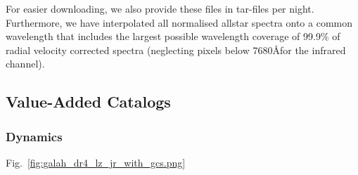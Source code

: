 \documentclass[
  journal=pasa,
  manuscript=research-paper, %
  year=2023,
  volume=37
]{cup-journal}
\newcommand{\SB}[1]{{\textcolor{purple}{#1}}}
\begin{document}
For easier downloading, we also provide these files in tar-files per night. Furthermore, we have interpolated all normalised allstar spectra onto a common wavelength that includes the largest possible wavelength coverage of 99.9\% of radial velocity corrected spectra (neglecting pixels below 7680\AA for the infrared channel).


\subsection{Value-Added Catalogs}

\subsubsection{Dynamics}

Fig.~\ref{fig:galah_dr4_lz_jr_with_gcs.png}
\end{document}
